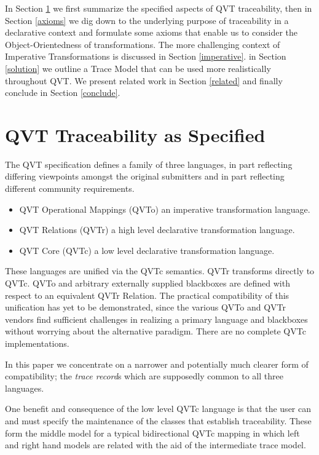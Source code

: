 \documentclass[runningheads,a4paper]{llncs}
\begin{document}
In Section \ref{qvt-spec} we first summarize the specified aspects of QVT traceability, then in Section \ref{axioms} we dig down to the underlying purpose of traceability in a declarative context and formulate some axioms that enable us to consider the Object-Orientedness of transformations. The more challenging context of Imperative Transformations is discussed in Section \ref{imperative}. in Section \ref{solution} we outline a Trace Model that can be used more realistically throughout QVT. We present related work in Section \ref{related} and finally conclude in Section \ref{conclude}.

\section{QVT Traceability as Specified}\label{qvt-spec}

The QVT specification defines a family of three languages, in part reflecting differing viewpoints amongst the original submitters and in part reflecting different community requirements. 
\begin{itemize}
\item QVT Operational Mappings (QVTo) an imperative transformation language.
\item QVT Relations (QVTr) a high level declarative transformation language.
\item QVT Core (QVTc) a low level declarative transformation language.
\end{itemize}

These languages are unified via the QVTc semantics. QVTr transforms directly to QVTc. QVTo and arbitrary externally supplied blackboxes are defined with respect to an equivalent QVTr Relation. The practical compatibility of this unification has yet to be demonstrated, since the various QVTo and QVTr vendors find sufficient challenges in realizing a primary language and blackboxes without worrying about the alternative paradigm. There are no complete QVTc implementations.

In this paper we concentrate on a narrower and potentially much clearer form of compatibility; the \emph{trace record}s which are supposedly common to all three languages.

One benefit and consequence of the low level QVTc language is that the user can and must specify the
maintenance of the classes that establish traceability. These form the middle model for a typical bidirectional
QVTc mapping in which left and right hand models are related with the aid of the intermediate trace model.
\end{document}
